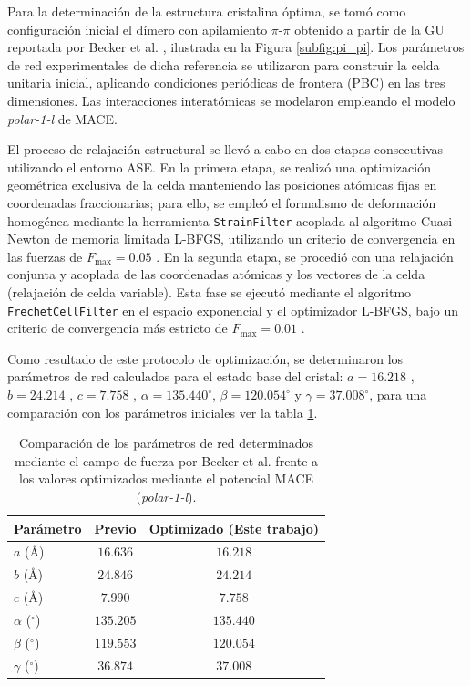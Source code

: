 \documentclass[12pt]{article}
\begin{document}
Para la determinación de la estructura cristalina óptima, se tomó como configuración inicial el dímero con apilamiento $\pi\text{-}\pi$ obtenido a partir de la GU reportada por Becker et al. \cite{becker2016bhematin}, ilustrada en la Figura \ref{subfig:pi_pi}. Los parámetros de red experimentales de dicha referencia se utilizaron para construir la celda unitaria inicial, aplicando condiciones periódicas de frontera (PBC) en las tres dimensiones. Las interacciones interatómicas se modelaron empleando el modelo \textit{polar-1-l} de MACE.

El proceso de relajación estructural se llevó a cabo en dos etapas consecutivas utilizando el entorno ASE. En la primera etapa, se realizó una optimización geométrica exclusiva de la celda manteniendo las posiciones atómicas fijas en coordenadas fraccionarias; para ello, se empleó el formalismo de deformación homogénea mediante la herramienta \texttt{StrainFilter} acoplada al algoritmo Cuasi-Newton de memoria limitada L-BFGS, utilizando un criterio de convergencia en las fuerzas de $F_{\text{max}} = 0.05$ . En la segunda etapa, se procedió con una relajación conjunta y acoplada de las coordenadas atómicas y los vectores de la celda (relajación de celda variable). Esta fase se ejecutó mediante el algoritmo \texttt{FrechetCellFilter} en el espacio exponencial y el optimizador L-BFGS, bajo un criterio de convergencia más estricto de $F_{\text{max}} = 0.01$ .

Como resultado de este protocolo de optimización, se determinaron los parámetros de red calculados para el estado base del cristal: $a = 16.218$ \text{\AA}, $b = 24.214$ \text{\AA}, $c = 7.758$ \text{\AA}, $\alpha = 135.440^\circ$, $\beta = 120.054^\circ$ y $\gamma = 37.008^\circ$, para una comparación con los parámetros iniciales ver la tabla \ref{tab:parametros_red}.

\begin{table}[htbp]
\centering
\caption{Comparación de los parámetros de red determinados mediante el campo de fuerza por Becker et al. \cite{becker2016bhematin} frente a los valores optimizados mediante el potencial MACE (\textit{polar-1-l}).}
\label{tab:parametros_red}
\begin{tabular}{lcc}
\toprule
\textbf{Parámetro} & \textbf{Previo \cite{becker2016bhematin}} & \textbf{Optimizado (Este trabajo)} \\
\midrule
$a$ (\AA)       & $16.636$ & $16.218$ \\
$b$ (\AA)       & $24.846$ & $24.214$ \\
$c$ (\AA)       & $7.990$ & $7.758$  \\
$\alpha$ ($^\circ$) & $135.205$ & $135.440$ \\
$\beta$ ($^\circ$)  & $119.553$ & $120.054$ \\
$\gamma$ ($^\circ$) & $36.874$ & $37.008$  \\
\bottomrule
\end{tabular}
\end{table}
\end{document}
